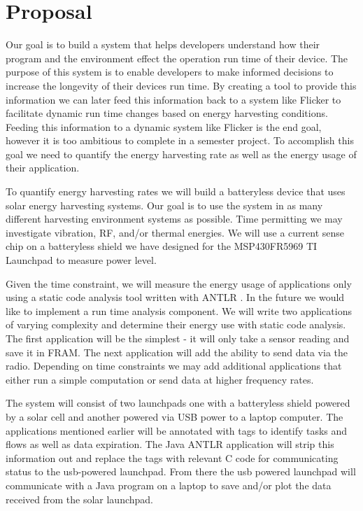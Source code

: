 \section{Proposal} %
\label{sec:proposal}

Our goal is to build a system that helps developers understand how their program and the environment effect the operation run time of their device.
The purpose of this system is to enable developers to make informed decisions to increase the longevity of their devices run time.
By creating a tool to provide this information we can later feed this information back to a system like Flicker \cite{flicker} to facilitate dynamic run time changes based on energy harvesting conditions.
Feeding this information to a dynamic system like Flicker is the end goal, however it is too ambitious to complete in a semester project.
To accomplish this goal we need to quantify the energy harvesting rate as well as the energy usage of their application.

To quantify energy harvesting rates we will build a batteryless device that uses solar energy harvesting systems.
Our goal is to use the system in as many different harvesting environment systems as possible.
Time permitting we may investigate vibration, RF, and/or thermal energies.
We will use a current sense chip on a batteryless shield we have designed for the MSP430FR5969 TI Launchpad to measure power level.

Given the time constraint, we will measure the energy usage of applications only using a static code analysis tool written with ANTLR \cite{antlr}.
In the future we would like to implement a run time analysis component.
We will write two applications of varying complexity and determine their energy use with static code analysis.
The first application will be the simplest - it will only take a sensor reading and save it in FRAM.
The next application will add the ability to send data via the radio.
Depending on time constraints we may add additional applications that either run a simple computation or send data at higher frequency rates.

The system will consist of two launchpads one with a batteryless shield powered by a solar cell and another powered via USB power to a laptop computer.
The applications mentioned earlier will be annotated with tags to identify tasks and flows as well as data expiration.
The Java ANTLR application will strip this information out and replace the tags with relevant C code for communicating status to the usb-powered launchpad.
From there the usb powered launchpad will communicate with a Java program on a laptop to save and/or plot the data received from the solar launchpad.
